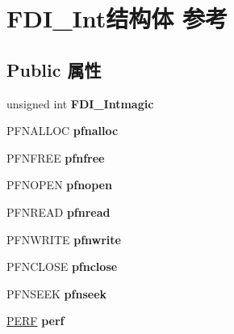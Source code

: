 \hypertarget{struct_f_d_i___int}{}\section{F\+D\+I\+\_\+\+Int结构体 参考}
\label{struct_f_d_i___int}
\subsection*{Public 属性}
\begin{DoxyCompactItemize}
\item 
\mbox{\label{struct_f_d_i___int_acd694e4d9448d42c8e4ff671bc409da9}} 
unsigned int {\bfseries F\+D\+I\+\_\+\+Intmagic}
\item 
\mbox{\label{struct_f_d_i___int_a00194b4c02ab40e8099ffe05ad29ac74}} 
P\+F\+N\+A\+L\+L\+OC {\bfseries pfnalloc}
\item 
\mbox{\label{struct_f_d_i___int_ad7e86ebd8073cedc65645d55e72ca8ee}} 
P\+F\+N\+F\+R\+EE {\bfseries pfnfree}
\item 
\mbox{\label{struct_f_d_i___int_a42121b85a1625e3ac73d628e0e72b301}} 
P\+F\+N\+O\+P\+EN {\bfseries pfnopen}
\item 
\mbox{\label{struct_f_d_i___int_a3f74dc28e498dcbb63b4047977db36b0}} 
P\+F\+N\+R\+E\+AD {\bfseries pfnread}
\item 
\mbox{\label{struct_f_d_i___int_a56e16c949d4fe45808f2db6d71eff0ae}} 
P\+F\+N\+W\+R\+I\+TE {\bfseries pfnwrite}
\item 
\mbox{\label{struct_f_d_i___int_aef7633362dd6fcc9c2f4a84b79a931a1}} 
P\+F\+N\+C\+L\+O\+SE {\bfseries pfnclose}
\item 
\mbox{\label{struct_f_d_i___int_a65493e2473637c0b2d848343815d0a8c}} 
P\+F\+N\+S\+E\+EK {\bfseries pfnseek}
\item 
\mbox{\label{struct_f_d_i___int_a8b98f6b2379b9a98e8fa3d27ebe712ef}} 
\hyperlink{struct_e_r_f}{P\+E\+RF} {\bfseries perf}
\item 

\end{DoxyCompactItemize}
